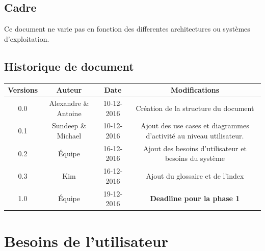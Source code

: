 \documentclass[10pt,a4paper]{article}
\begin{document}
\subsection{Cadre}

\noindent Ce document ne varie pas en fonction des differentes architectures ou systèmes d'exploitation.

\glsaddall
\printglossary[numberedsection]

\subsection{Historique de document}

\begin{center}
\hspace*{0cm}
\begin{tabular}{|c|c|c|c|}
\hline
Versions & Auteur & Date & Modifications \\
\hline
0.0 & Alexandre \& Antoine & 10-12-2016 & Création de la structure du document\\
0.1 & Sundeep \& Michael & 10-12-2016 & Ajout des use cases et diagrammes d'activité au niveau utilisateur.\\
0.2 & Équipe & 16-12-2016 & Ajout des besoins d'utilisateur et besoins du système\\
0.3 & Kim & 16-12-2016 & Ajout du glossaire et de l'index\\
1.0 & Équipe & 19-12-2016 & \textbf{Deadline pour la phase 1}\\
\hline
\end{tabular}
\end{center}


\newpage
\section{Besoins de l'utilisateur}
\end{document}
